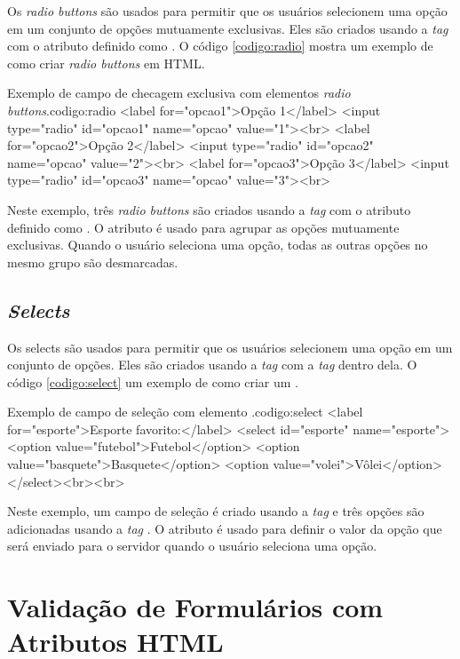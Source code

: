 Os \textit{radio buttons} são usados para permitir que os usuários selecionem uma opção em um conjunto de opções mutuamente exclusivas. Eles são criados usando a \textit{tag}  com o atributo  definido como . O código \ref{codigo:radio} mostra um exemplo de como criar \textit{radio buttons} em HTML.

\begin{htmlcode}{Exemplo de campo de checagem exclusiva com elementos \textit{radio buttons}.}{codigo:radio}
<label for="opcao1">Opção 1</label>
<input type="radio" id="opcao1" name="opcao" value="1"><br>
<label for="opcao2">Opção 2</label>
<input type="radio" id="opcao2" name="opcao" value="2"><br>
<label for="opcao3">Opção 3</label>
<input type="radio" id="opcao3" name="opcao" value="3"><br>
\end{htmlcode}

Neste exemplo, três \textit{radio buttons} são criados usando a \textit{tag}  com o atributo  definido como . O atributo  é usado para agrupar as opções mutuamente exclusivas. Quando o usuário seleciona uma opção, todas as outras opções no mesmo grupo são desmarcadas.

\subsection{\textit{Selects}}

Os selects são usados para permitir que os usuários selecionem uma opção em um conjunto de opções. Eles são criados usando a \textit{tag}  com a \textit{tag}  dentro dela. O código \ref{codigo:select} um exemplo de como criar um .

\begin{htmlcode}{Exemplo de campo de seleção com elemento .}{codigo:select}
<label for="esporte">Esporte favorito:</label>
<select id="esporte" name="esporte">
   <option value="futebol">Futebol</option>
   <option value="basquete">Basquete</option>
   <option value="volei">Vôlei</option>
</select><br><br>
\end{htmlcode}

Neste exemplo, um campo de seleção é criado usando a \textit{tag}  e três opções são adicionadas usando a \textit{tag} . O atributo  é usado para definir o valor da opção que será enviado para o servidor quando o usuário seleciona uma opção.

\section{Validação de Formulários com Atributos HTML}

